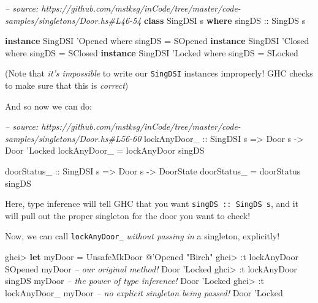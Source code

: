 \documentclass[]{article}
\newenvironment{Shaded}{}{}
\newcommand{\KeywordTok}[1]{\textcolor[rgb]{0.00,0.44,0.13}{\textbf{#1}}}
\newcommand{\DataTypeTok}[1]{\textcolor[rgb]{0.56,0.13,0.00}{#1}}
\newcommand{\CharTok}[1]{\textcolor[rgb]{0.25,0.44,0.63}{#1}}
\newcommand{\CommentTok}[1]{\textcolor[rgb]{0.38,0.63,0.69}{\textit{#1}}}
\newcommand{\OtherTok}[1]{\textcolor[rgb]{0.00,0.44,0.13}{#1}}
\newcommand{\FunctionTok}[1]{\textcolor[rgb]{0.02,0.16,0.49}{#1}}
\newcommand{\NormalTok}[1]{#1}
\begin{document}
\begin{Shaded}
\begin{Highlighting}[]
\CommentTok{-- source: https://github.com/mstksg/inCode/tree/master/code-samples/singletons/Door.hs#L46-54}
\KeywordTok{class} \DataTypeTok{SingDSI}\NormalTok{ s }\KeywordTok{where}
\OtherTok{    singDS ::} \DataTypeTok{SingDS}\NormalTok{ s}

\KeywordTok{instance} \DataTypeTok{SingDSI} \CharTok{'Opened where}
\NormalTok{    singDS }\FunctionTok{=} \DataTypeTok{SOpened}
\KeywordTok{instance} \DataTypeTok{SingDSI} \CharTok{'Closed where}
\NormalTok{    singDS }\FunctionTok{=} \DataTypeTok{SClosed}
\KeywordTok{instance} \DataTypeTok{SingDSI} \CharTok{'Locked where}
\NormalTok{    singDS }\FunctionTok{=} \DataTypeTok{SLocked}
\end{Highlighting}
\end{Shaded}

(Note that \emph{it's impossible} to write our \texttt{SingDSI} instances
improperly! GHC checks to make sure that this is \emph{correct})

And so now we can do:

\begin{Shaded}
\begin{Highlighting}[]
\CommentTok{-- source: https://github.com/mstksg/inCode/tree/master/code-samples/singletons/Door.hs#L56-60}
\OtherTok{lockAnyDoor_ ::} \DataTypeTok{SingDSI}\NormalTok{ s }\OtherTok{=>} \DataTypeTok{Door}\NormalTok{ s }\OtherTok{->} \DataTypeTok{Door} \CharTok{'Locked}
\NormalTok{lockAnyDoor_ }\FunctionTok{=}\NormalTok{ lockAnyDoor singDS}

\OtherTok{doorStatus_ ::} \DataTypeTok{SingDSI}\NormalTok{ s }\OtherTok{=>} \DataTypeTok{Door}\NormalTok{ s }\OtherTok{->} \DataTypeTok{DoorState}
\NormalTok{doorStatus_ }\FunctionTok{=}\NormalTok{ doorStatus singDS}
\end{Highlighting}
\end{Shaded}

Here, type inference will tell GHC that you want \texttt{singDS\ ::\ SingDS\ s},
and it will pull out the proper singleton for the door you want to check!

Now, we can call \texttt{lockAnyDoor\_} \emph{without passing in} a singleton,
explicitly!

\begin{Shaded}
\begin{Highlighting}[]
\NormalTok{ghci}\FunctionTok{>} \KeywordTok{let}\NormalTok{ myDoor }\FunctionTok{=} \DataTypeTok{UnsafeMkDoor} \FunctionTok{@}\CharTok{'Opened "Birch"}
\NormalTok{ghci}\FunctionTok{>} \FunctionTok{:}\NormalTok{t lockAnyDoor }\DataTypeTok{SOpened}\NormalTok{ myDoor }\CommentTok{-- our original method!}
\DataTypeTok{Door} \CharTok{'Locked}
\NormalTok{ghci}\FunctionTok{>} \FunctionTok{:}\NormalTok{t lockAnyDoor singDS myDoor  }\CommentTok{-- the power of type inference!}
\DataTypeTok{Door} \CharTok{'Locked}
\NormalTok{ghci}\FunctionTok{>} \FunctionTok{:}\NormalTok{t lockAnyDoor_ myDoor        }\CommentTok{-- no explicit singleton being passed!}
\DataTypeTok{Door} \CharTok{'Locked}
\end{Highlighting}
\end{Shaded}
\end{document}
